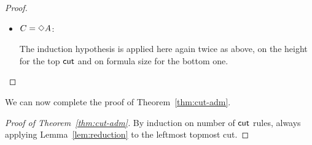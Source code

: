 \documentclass[a4paper]{article}
\begin{document}
\begin{proof}
\begin{description}
\begin{itemize}
The top $\rn{cut}$ is admissible by induction on the height, as the size of the cut-formula is constant. This however may increase the height above the right premiss of the bottom $\rn{cut}$ arbitrarily. The bottom $\rn{cut}$ is still admissible as the size of the cut-formula decreases.

\item $C=\mathord{\Diamond} A$:

\begin{smallequation*}
\end{smallequation*}

\begin{smallequation*}
\end{smallequation*}
The induction hypothesis is applied here again twice as above, on the height for the top $\rn{cut}$ and on formula size for the bottom one.
\end{itemize}
\end{description}
\end{proof}


We can now complete the proof of Theorem~\ref{thm:cut-adm}.
\begin{proof}[Proof of Theorem~\ref{thm:cut-adm}]
	By induction on number of $\rn{cut}$ rules, always applying Lemma~\ref{lem:reduction} to the leftmost topmost cut.
\end{proof}
\newcommand{\set}[1]{\{#1\}}
\end{document}

